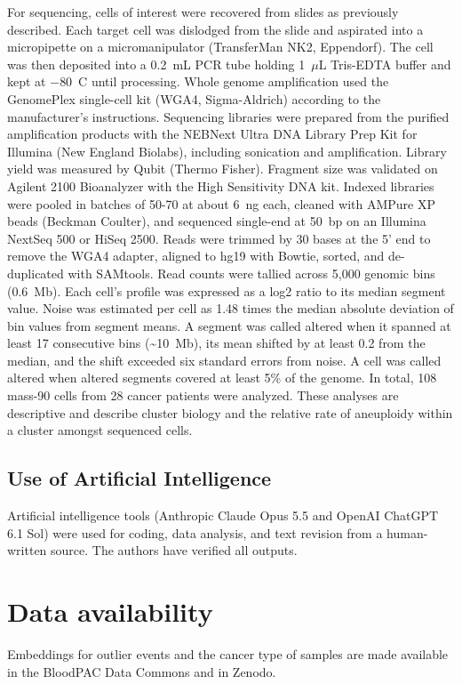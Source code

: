 \documentclass[11pt]{article}
\begin{document}
For sequencing, cells of interest were recovered from slides as previously described\cite{dago2014,malihi2020}. Each target cell was dislodged from the slide and aspirated into a micropipette on a micromanipulator (TransferMan NK2, Eppendorf). The cell was then deposited into a 0.2~mL PCR tube holding 1~$\mu$L Tris-EDTA buffer and kept at $-$80~\textdegree C until processing. Whole genome amplification used the GenomePlex single-cell kit (WGA4, Sigma-Aldrich) according to the manufacturer's instructions. Sequencing libraries were prepared from the purified amplification products with the NEBNext Ultra DNA Library Prep Kit for Illumina (New England Biolabs), including sonication and amplification. Library yield was measured by Qubit (Thermo Fisher). Fragment size was validated on Agilent 2100 Bioanalyzer with the High Sensitivity DNA kit. Indexed libraries were pooled in batches of 50-70 at about 6~ng each, cleaned with AMPure XP beads (Beckman Coulter), and sequenced single-end at 50~bp on an Illumina NextSeq 500 or HiSeq 2500. Reads were trimmed by 30 bases at the 5' end to remove the WGA4 adapter, aligned to hg19 with Bowtie\cite{langmead2009}, sorted, and de-duplicated with SAMtools\cite{li2009}. Read counts were tallied across 5,000 genomic bins (0.6~Mb)\cite{baslan2012}. Each cell's profile was expressed as a log2 ratio to its median segment value. Noise was estimated per cell as 1.48 times the median absolute deviation of bin values from segment means. A segment was called altered when it spanned at least 17 consecutive bins (\textasciitilde 10~Mb), its mean shifted by at least 0.2 from the median, and the shift exceeded six standard errors from noise. A cell was called altered when altered segments covered at least 5\% of the genome. In total, 108 mass-90 cells from 28 cancer patients were analyzed. These analyses are descriptive and describe cluster biology and the relative rate of aneuploidy within a cluster amongst sequenced cells.

\subsection*{Use of Artificial Intelligence}

Artificial intelligence tools (Anthropic Claude Opus 5.5 and OpenAI ChatGPT 6.1 Sol) were used for coding, data analysis, and text revision from a human-written source. The authors have verified all outputs.

\section*{Data availability}
Embeddings for outlier events and the cancer type of samples are made available in the BloodPAC Data Commons and in Zenodo.
\end{document}
